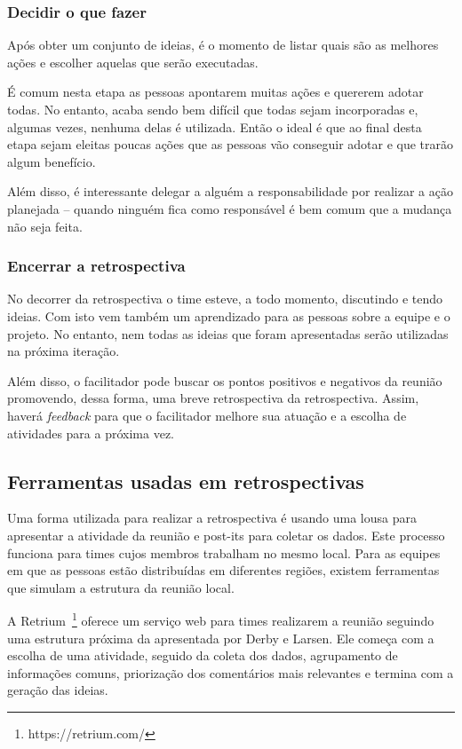 \subsubsection*{Decidir o que fazer}

Após obter um conjunto de ideias, é o momento de listar quais são as melhores ações e escolher aquelas que serão executadas.

É comum nesta etapa as pessoas apontarem muitas ações e quererem adotar todas. No entanto, acaba sendo bem difícil que todas sejam incorporadas e, algumas vezes, nenhuma delas é utilizada. Então o ideal é que ao final desta etapa sejam eleitas poucas ações que as pessoas vão conseguir adotar e que trarão algum benefício.

Além disso, é interessante delegar a alguém a responsabilidade por realizar a ação planejada -- quando ninguém fica como responsável é bem comum que a mudança não seja feita.

\subsubsection*{Encerrar a retrospectiva}

No decorrer da retrospectiva o time esteve, a todo momento, discutindo e tendo ideias. Com isto vem também um aprendizado para as pessoas sobre a equipe e o projeto. No entanto, nem todas as ideias que foram apresentadas serão utilizadas na próxima iteração.

Além disso, o facilitador pode  buscar os pontos positivos e negativos da reunião promovendo, dessa forma, uma breve retrospectiva da retrospectiva. Assim, haverá \textit{feedback} para que o facilitador melhore sua atuação e a escolha de atividades para a próxima vez.

\subsection{Ferramentas usadas em retrospectivas}

Uma forma utilizada para realizar a retrospectiva é usando uma lousa para apresentar a atividade da reunião e post-its para coletar os dados. Este processo funciona para times cujos membros trabalham no mesmo local. Para as equipes em que as pessoas estão distribuídas em diferentes regiões, existem ferramentas que simulam a estrutura da reunião local.

A Retrium~\footnote{https://retrium.com/} oferece um serviço web para times realizarem a reunião seguindo uma estrutura próxima da apresentada por Derby e Larsen. Ele começa com a escolha de uma atividade, seguido da coleta dos dados, agrupamento de informações comuns, priorização dos comentários mais relevantes e termina com a geração das ideias.

